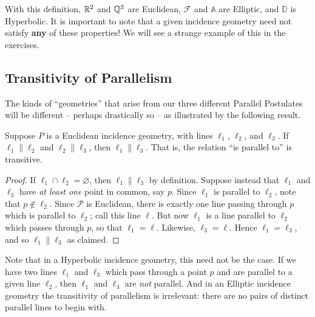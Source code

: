 With this definition, \(\mathbb{R}^2\) and \(\mathbb{Q}^2\) are Euclidean, \(\mathcal{F}\) and \(\mathbb{A}\) are Elliptic, and \(\mathbb{D}\) is Hyperbolic.
It is important to note that a given incidence geometry need not satisfy \textbf{any} of these properties! We will see a strange example of this in the exercises.



\subsection*{Transitivity of Parallelism}

The kinds of ``geometries'' that arise from our three different Parallel Postulates will be different -- perhaps drastically so -- as illustrated by the following result.

\begin{prop}
Suppose \(P\) is a Euclidean incidence geometry, with lines \(\ell_1\), \(\ell_2\), and \(\ell_3\).
If \(\ell_1 \parallel \ell_2\) and \(\ell_2 \parallel \ell_3\), then \(\ell_1 \parallel \ell_3\).
That is, the relation ``is parallel to'' is transitive.
\end{prop}

\begin{proof}
If \(\ell_1 \cap \ell_2 = \varnothing\), then \(\ell_1 \parallel \ell_3\) by definition.
Suppose instead that \(\ell_1\) and \(\ell_3\) have \emph{at least one} point in common, say \(p\).
Since \(\ell_1\) is parallel to \(\ell_2\), note that \(p \notin \ell_2\).
Since \(\mathcal{P}\) is Euclidean, there is exactly one line passing through \(p\) which is parallel to \(\ell_2\); call this line \(\ell\).
But now \(\ell_1\) is a line parallel to \(\ell_2\) which passes through \(p\), so that \(\ell_1 = \ell\).
Likewise, \(\ell_3 = \ell\).
Hence \(\ell_1 = \ell_3\), and so \(\ell_1 \parallel \ell_3\) as claimed.
\end{proof}

Note that in a Hyperbolic incidence geometry, this need not be the case.
If we have two lines \(\ell_1\) and \(\ell_3\) which pass through a point \(p\) and are parallel to a given line \(\ell_2\), then \(\ell_1\) and \(\ell_3\) are \emph{not} parallel.
And in an Elliptic incidence geometry the transitivity of parallelism is irrelevant: there are no pairs of distinct parallel lines to begin with.



\Exercises%

